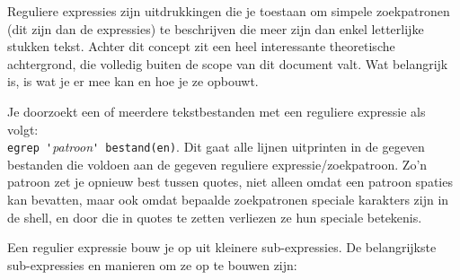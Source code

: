 \documentclass[a4paper,twoside,openany]{memoir}
\begin{document}
Reguliere expressies zijn uitdrukkingen die je toestaan om simpele zoekpatronen
(dit zijn dan de expressies) te beschrijven die meer zijn dan enkel letterlijke
stukken tekst. Achter dit concept zit een heel interessante theoretische
achtergrond, die volledig buiten de scope van dit document valt. Wat belangrijk
is, is wat je er mee kan en hoe je ze opbouwt.

Je doorzoekt een of meerdere tekstbestanden met een reguliere expressie als
volgt:\\
\verb!egrep '!\emph{patroon}\verb!' bestand(en)!. Dit gaat alle lijnen
uitprinten in de gegeven bestanden die voldoen aan de gegeven reguliere
expressie/zoekpatroon. Zo'n patroon zet je opnieuw best tussen quotes, niet
alleen omdat een patroon spaties kan bevatten, maar ook omdat bepaalde
zoekpatronen speciale karakters zijn in de shell, en door die in quotes te
zetten verliezen ze hun speciale betekenis.

Een regulier expressie bouw je op uit kleinere sub-expressies. De belangrijkste sub-expressies en manieren om ze op te bouwen zijn:
\end{document}
